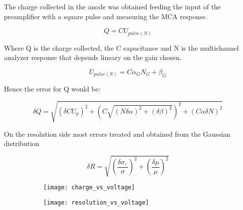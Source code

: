 The charge collected in the anode was obtained feeding the input of the preamplifier with a square pulse and measuring the MCA response.

\begin{equation}
  Q = C U_{pulse (N)} 
\end{equation}

Where Q is the charge collected, the C capacitance and N is the multichannel analyzer response that depends lineary on the gain chosen.

\begin{equation}
  U_{pulse (N)}= C\alpha_G N_G + \beta_G
\end{equation}

Hence the error for Q would be:

\begin{equation}
  \delta Q = \sqrt{(\delta CU_p )^2 + (C \sqrt{(N\delta \alpha)^2+(\delta \beta)^2} )^2 + (C\alpha \delta N)^2}
\end{equation}

On the resolution side most errors treated and obtained from the Gaussian distribution

\begin{equation}
  \delta R = \sqrt{(\frac{\delta \sigma,}{\sigma})^2 + (\frac{\delta \mu}{\mu})^2}
\end{equation}



\begin{figure}[!h]
  \centering
  \begin{subfigure}[t]{.48\linewidth}
    \texttt{[image: charge\_vs\_voltage]}
    \caption{}
    \label{fig:charge_vs_voltage}
  \end{subfigure}
  \begin{subfigure}[t]{.48\linewidth}
    \texttt{[image: resolution\_vs\_voltage]}
    \caption{}
    \label{fig:resolution_vs_voltage}
  \end{subfigure}
  \caption{}
  \label{fig:results}
\end{figure}

